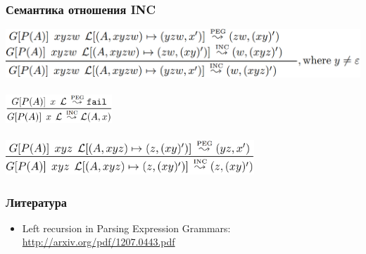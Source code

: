 \documentclass{beamer}
\begin{document}
\begin{frame}[fragile]
  \transwipe[direction=90]
  \frametitle{Семантика отношения INC}
\begin{center}
  \includegraphics[width=1.0\textwidth]{pics/incr1}  \\~\\     \pause
  \includegraphics[width=0.3\textwidth]{pics/incr2}  \\~\\     \pause
  \includegraphics[width=0.7\textwidth]{pics/incr3}  
\end{center}
\end{frame}



\begin{frame}[fragile]
  \transwipe[direction=90]
  \frametitle{Литература}
\begin{itemize}
  \item Left recursion in Parsing Expression Grammars: \url{http://arxiv.org/pdf/1207.0443.pdf}
\end{itemize}

\end{frame}
\end{document}
